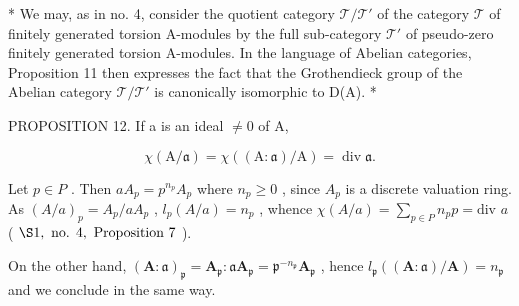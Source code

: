 * We may, as in no. 4, consider the quotient category \(\mathcal{T} / \mathcal{T}'\) of the category \(\mathcal{T}\) of finitely generated torsion A-modules by the full sub-category \(\mathcal{T}'\) of pseudo-zero finitely generated torsion A-modules. In the language of Abelian categories, Proposition 11 then expresses the fact that the Grothendieck group of the Abelian category \(\mathcal{T} / \mathcal{T}'\) is canonically isomorphic to D(A). *

PROPOSITION 12. If a is an ideal \(\neq 0\) of A,

\[
\chi (\mathrm{A} / \mathfrak {a}) = \chi ((\mathrm{A}: \mathfrak {a}) / \mathrm{A}) = \operatorname{div} \mathfrak {a}.
\]

Let \(p \in P\) . Then \(aA_p = p^{n_p}A_p\) where \(n_p \geqslant 0\) , since \(A_p\) is a discrete valuation ring. As \((A/a)_p = A_p/aA_p\) , \(l_p(A/a) = n_p\) , whence \(\chi(A/a) = \sum_{p \in P} n_p p = \text{div } a\) ( \(\S 1, \text{ no. } 4, \text{ Proposition } 7\) ).

On the other hand, \((\mathbf{A}:\mathfrak{a})_{\mathfrak{p}} = \mathbf{A}_{\mathfrak{p}}\colon \mathfrak{a}\mathbf{A}_{\mathfrak{p}} = \mathfrak{p}^{-n_{\mathfrak{p}}}\mathbf{A}_{\mathfrak{p}}\) , hence \(l_{\mathfrak{p}}((\mathbf{A}:\mathfrak{a}) / \mathbf{A}) = n_{\mathfrak{p}}\) and we conclude in the same way.

